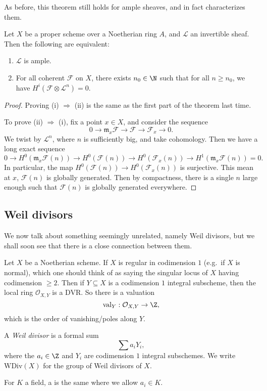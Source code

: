 \documentclass[a4paper]{article}
\newcommand\val{\mathrm{val}}
\newcommand\WDiv{\mathrm{WDiv}}
\begin{document}
As before, this theorem still holds for ample sheaves, and in fact characterizes them.
\begin{thm}
  Let $X$ be a proper scheme over a Noetherian ring $A$, and $\mathcal{L}$ an invertible sheaf. Then the following are equivalent:
  \begin{enumerate}
    \item $\mathcal{L}$ is ample.
    \item For all coherent $\mathcal{F}$ on $X$, there exists $n_0 \in \N$ such that for all $n \geq n_0$, we have $H^i(\mathcal{F} \otimes \mathcal{L}^n) = 0$.
  \end{enumerate}
\end{thm}

\begin{proof}
  Proving (i) $\Rightarrow$ (ii) is the same as the first part of the theorem last time.

  To prove (ii) $\Rightarrow$ (i), fix a point $x \in X$, and consider the sequence
  \[
    0 \to \mathfrak{m}_x \mathcal{F} \to \mathcal{F} \to \mathcal{F}_x \to 0.
  \]
  We twist by $\mathcal{L}^n$, where $n$ is sufficiently big, and take cohomology. Then we have a long exact sequence
  \[
    0 \to H^0(\mathfrak{m}_x \mathcal{F}(n)) \to H^0(\mathcal{F}(n)) \to H^0(\mathcal{F}_x(n)) \to H^1(\mathfrak{m}_x \mathcal{F}(n)) = 0.
  \]
  In particular, the map $H^0(\mathcal{F}(n)) \to H^0(\mathcal{F}_x(n))$ is surjective. This mean at $x$, $\mathcal{F}(n)$ is globally generated. Then by compactness, there is a single $n$ large enough such that $\mathcal{F}(n)$ is globally generated everywhere.
\end{proof}

\subsection{Weil divisors}
We now talk about something seemingly unrelated, namely Weil divisors, but we shall soon see that there is a close connection between them.

Let $X$ be a Noetherian scheme. If $X$ is regular in codimension $1$ (e.g.\ if $X$ is normal), which one should think of as saying the singular locus of $X$ having codimension $ \geq 2$. Then if $Y \subseteq X$ is a codimension $1$ integral subscheme, then the local ring $\mathcal{O}_{X, Y}$ is a DVR. So there is a valuation
\[
  \val_Y: \mathcal{O}_{X, Y} \to \Z,
\]
which is the order of vanishing/poles along $Y$.

\begin{defi}
  A \emph{Weil divisor} is a formal sum
  \[
    \sum a_i Y_i,
  \]
  where the $a_i \in \Z$ and $Y_i$ are codimension $1$ integral subschemes. We write $\WDiv(X)$ for the group of Weil divisors of $X$.

  For $K$ a field, a  is the same where we allow $a_i \in K$.
\end{defi}
\end{document}
